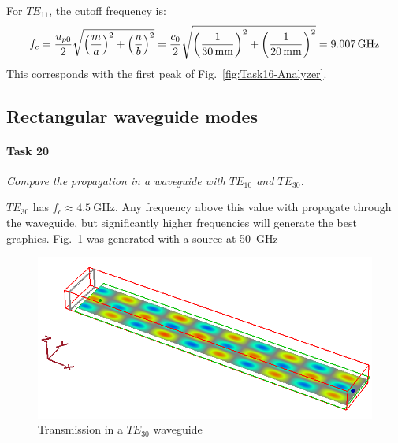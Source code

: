 For $TE_{11}$, the cutoff frequency is:
\begin{align*}
	f_c = {u_{p0} \over 2} \sqrt{\left({m \over a}\right)^2 + \left({n \over b}\right)^2} = {c_0 \over 2} \sqrt{\left({1 \over \SI{30}{\milli\meter}}\right)^2 + \left({1 \over \SI{20}{\milli\meter}}\right)^2} = \SI{9.007}{\giga\hertz}
\end{align*}
This corresponds with the first peak of Fig.~\ref{fig:Task16-Analyzer}.


\subsection{Rectangular waveguide modes}
\paragraph{Task 20}\textit{Compare the propagation in a waveguide with $TE_{10}$ and $TE_{30}$.}

$TE_{30}$ has $f_c \approx \SI{4.5}{\giga\hertz}$.
Any frequency above this value with propagate through the waveguide, but significantly higher frequencies will generate the best graphics.
Fig.~\ref{fig:Task20-T30-50GHz} was generated with a source at \SI{50}{\giga\hertz}

\begin{figure}[tbph]
	\centering
	\includegraphics[width=0.7\linewidth]{graphics/Task20-T30-50GHz}
	\caption{Transmission in a $TE_{30}$ waveguide}
	\label{fig:Task20-T30-50GHz}
\end{figure}

